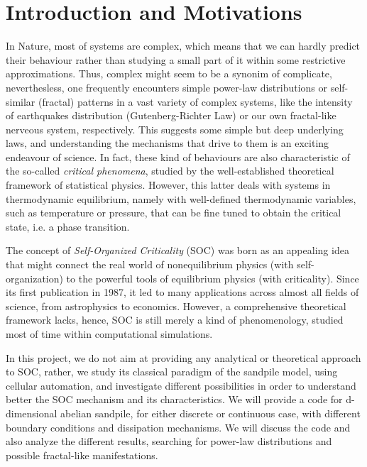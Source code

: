 \chapter{Introduction and Motivations}
\thispagestyle{fancy}


In Nature, most of systems are complex, 
which means that we can hardly predict their behaviour rather than studying a small part of it within some restrictive approximations.
Thus, complex might seem to be a synonim of complicate, 
neverthesless, one frequently encounters simple power-law distributions or self-similar (fractal) patterns in a vast variety of complex systems, 
like the intensity of earthquakes distribution (Gutenberg-Richter Law) or our own fractal-like nerveous system, respectively. 
This suggests some simple but deep underlying laws, and understanding the mechanisms that drive to them is an exciting endeavour of science.
In fact, these kind of behaviours are also characteristic of the so-called \emph{critical phenomena}, studied by the well-established theoretical framework of statistical physics.
However, this latter deals with systems in thermodynamic equilibrium, namely with well-defined thermodynamic variables, such as temperature or pressure, 
that can be fine tuned to obtain the critical state, i.e. a phase transition.


The concept of \emph{Self-Organized Criticality} (SOC) was born as an appealing idea that might connect 
the real world of nonequilibrium physics (with self-organization) to the powerful tools of equilibrium physics (with criticality). 
Since its first publication in 1987, it led to many applications across almost all fields of science, from astrophysics to economics.
However, a comprehensive theoretical framework lacks, hence, SOC is still merely a kind of phenomenology, studied most of time within computational simulations.
 
In this project, we do not aim at providing any analytical or theoretical approach to SOC, 
rather, we study its classical paradigm of the sandpile model, using cellular automation, 
and investigate different possibilities in order to understand better the SOC mechanism and its characteristics.
We will provide a code for d-dimensional abelian sandpile, for either discrete or continuous case, with different boundary conditions and dissipation mechanisms.
We will discuss the code and also analyze the different results, searching for power-law distributions and possible fractal-like manifestations. 


